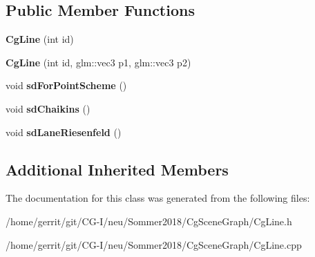 \subsection*{Public Member Functions}
\begin{DoxyCompactItemize}
\item 
\mbox{\label{class_cg_line_accbd6f3816f11e98f43dfe96ebbc8304}} 
{\bfseries Cg\+Line} (int id)
\item 
\mbox{\label{class_cg_line_a20016670a68f7a6ceafcda2a6570aaf8}} 
{\bfseries Cg\+Line} (int id, glm\+::vec3 p1, glm\+::vec3 p2)
\item 
\mbox{\label{class_cg_line_ac459db053cf671903f6b3d8fe4c42ca7}} 
void {\bfseries sd\+For\+Point\+Scheme} ()
\item 
\mbox{\label{class_cg_line_ac74ec84ec2d63941521955c64104923c}} 
void {\bfseries sd\+Chaikins} ()
\item 
\mbox{\label{class_cg_line_abb5f1b27a4729340f8c23e937765a68e}} 
void {\bfseries sd\+Lane\+Riesenfeld} ()
\end{DoxyCompactItemize}
\subsection*{Additional Inherited Members}


The documentation for this class was generated from the following files\+:\begin{DoxyCompactItemize}
\item 
/home/gerrit/git/\+C\+G-\/\+I/neu/\+Sommer2018/\+Cg\+Scene\+Graph/Cg\+Line.\+h\item 
/home/gerrit/git/\+C\+G-\/\+I/neu/\+Sommer2018/\+Cg\+Scene\+Graph/Cg\+Line.\+cpp\end{DoxyCompactItemize}
